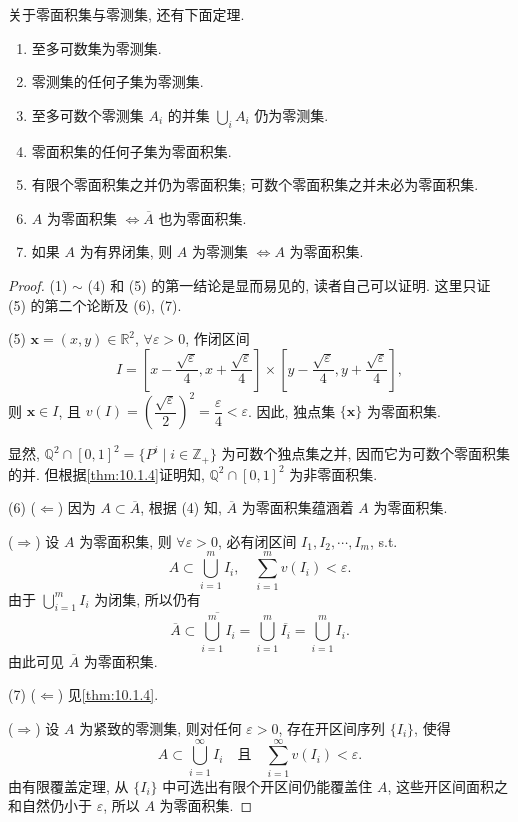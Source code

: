 关于零面积集与零测集, 还有下面定理.

\begin{theorem}\label{thm:10.1.5}
\begin{enumerate}
  \item 至多可数集为零测集.
  \item 零测集的任何子集为零测集.
  \item 至多可数个零测集 $A_i$ 的并集 $\bigcup\limits_{i} A_i$ 仍为零测集.
  \item 零面积集的任何子集为零面积集.
  \item 有限个零面积集之并仍为零面积集; 可数个零面积集之并未必为零面积集.
  \item $A$ 为零面积集 $\iff \overline{A}$ 也为零面积集.
  \item 如果 $A$ 为有界闭集, 则 $A$ 为零测集 $\iff A$ 为零面积集.
\end{enumerate}
\end{theorem}

\begin{proof}
(1) $\sim$ (4) 和 (5) 的第一结论是显而易见的, 读者自己可以证明. 这里只证 (5) 的第二个论断及 (6), (7).

(5) $\boldsymbol{x} = (x, y) \in \mathbb{R}^{2}$, $\forall \varepsilon > 0$, 作闭区间
\[
  I = \left[x - \frac{\sqrt{\varepsilon}}{4}, x + \frac{\sqrt{\varepsilon}}{4}\right] \times \left[y - \frac{\sqrt{\varepsilon}}{4}, y + \frac{\sqrt{\varepsilon}}{4}\right],
\]
则 $\boldsymbol{x} \in I$, 且 $v(I) = \left(\dfrac{\sqrt{\varepsilon}}{2}\right)^{2} = \dfrac{\varepsilon}{4} < \varepsilon$. 因此, 独点集 $\{\boldsymbol{x}\}$ 为零面积集.

显然, $\mathbb{Q}^2 \cap [0, 1]^2 = \{P^i \mid i \in \mathbb{Z}_+\}$ 为可数个独点集之并, 因而它为可数个零面积集的并. 但根据\cref{thm:10.1.4}证明知, $\mathbb{Q}^2 \cap [0, 1]^2$ 为非零面积集.

(6) ($\Leftarrow$) 因为 $A \subset \overline{A}$, 根据 (4) 知, $\overline{A}$ 为零面积集蕴涵着 $A$ 为零面积集.

($\Rightarrow$) 设 $A$ 为零面积集, 则 $\forall \varepsilon > 0$, 必有闭区间 $I_{1}, I_{2}, \cdots, I_{m}$, s.t.
\[
  A \subset \bigcup_{i=1}^{m} I_{i}, \quad \sum_{i=1}^{m} v(I_{i}) < \varepsilon.
\]
由于 $\bigcup\limits_{i=1}^{m} I_{i}$ 为闭集, 所以仍有
\[
  \overline{A} \subset \overline{\bigcup_{i=1}^{m} I_{i}} = \bigcup_{i=1}^{m} \overline{I_{i}} = \bigcup_{i=1}^{m} I_{i}.
\]
由此可见 $\overline{A}$ 为零面积集.

(7) ($\Leftarrow$) 见\cref{thm:10.1.4}.

($\Rightarrow$) 设 $A$ 为紧致的零测集, 则对任何 $\varepsilon > 0$, 存在开区间序列 $\{I_{i}\}$, 使得
\[
  A \subset \bigcup_{i=1}^{\infty} I_{i} \quad\text{且}\quad \sum_{i=1}^{\infty} v(I_{i}) < \varepsilon.
\]
由有限覆盖定理, 从 $\{I_{i}\}$ 中可选出有限个开区间仍能覆盖住 $A$, 这些开区间面积之和自然仍小于 $\varepsilon$, 所以 $A$ 为零面积集.
\end{proof}

